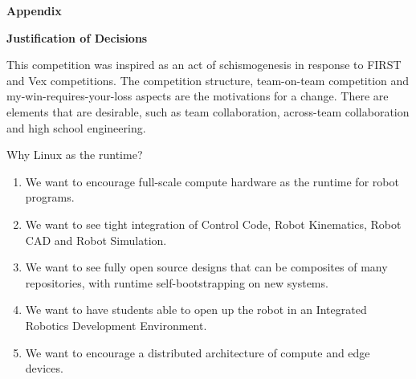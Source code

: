 \documentclass{article}
\begin{document}
\vspace{1cm}
 \pagebreak
 {\huge \textbf{Appendix}}
 
  \pagebreak
  \vspace{1cm}
 {\huge \textbf{Justification of Decisions}}
\vspace{1cm}

This competition was inspired as an act of schismogenesis in response to FIRST and Vex competitions. The competition structure, team-on-team competition and my-win-requires-your-loss aspects are the motivations for a change. There are elements that are desirable, such as team collaboration, across-team collaboration and high school engineering. 

Why Linux as the runtime? 
\begin{enumerate}
\item We want to encourage full-scale compute hardware as the runtime for robot programs. 

\item We want to see tight integration of Control Code, Robot Kinematics, Robot CAD and Robot Simulation. 

\item We want to see fully open source designs that can be composites of many repositories, with runtime self-bootstrapping on new systems. 

\item We want to have students able to open up the robot in an Integrated Robotics Development Environment. 

\item We want to encourage a distributed architecture of compute and edge devices. 
 
\end{enumerate}
\vspace{1cm}
\end{document}
